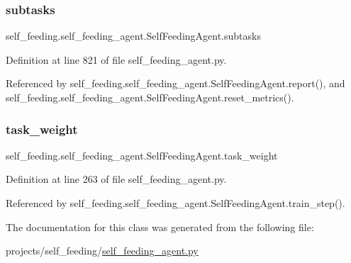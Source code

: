\subsubsection{\texorpdfstring{subtasks}{subtasks}}
{\footnotesize\ttfamily self\+\_\+feeding.\+self\+\_\+feeding\+\_\+agent.\+Self\+Feeding\+Agent.\+subtasks}



Definition at line 821 of file self\+\_\+feeding\+\_\+agent.\+py.



Referenced by self\+\_\+feeding.\+self\+\_\+feeding\+\_\+agent.\+Self\+Feeding\+Agent.\+report(), and self\+\_\+feeding.\+self\+\_\+feeding\+\_\+agent.\+Self\+Feeding\+Agent.\+reset\+\_\+metrics().

\mbox{\label{classself__feeding_1_1self__feeding__agent_1_1SelfFeedingAgent_a2b74d181da38d6a0f91273d7802249a4}} 
\subsubsection{\texorpdfstring{task\+\_\+weight}{task\_weight}}
{\footnotesize\ttfamily self\+\_\+feeding.\+self\+\_\+feeding\+\_\+agent.\+Self\+Feeding\+Agent.\+task\+\_\+weight}



Definition at line 263 of file self\+\_\+feeding\+\_\+agent.\+py.



Referenced by self\+\_\+feeding.\+self\+\_\+feeding\+\_\+agent.\+Self\+Feeding\+Agent.\+train\+\_\+step().



The documentation for this class was generated from the following file\+:\begin{DoxyCompactItemize}
\item 
projects/self\+\_\+feeding/\hyperlink{self__feeding__agent_8py}{self\+\_\+feeding\+\_\+agent.\+py}\end{DoxyCompactItemize}
